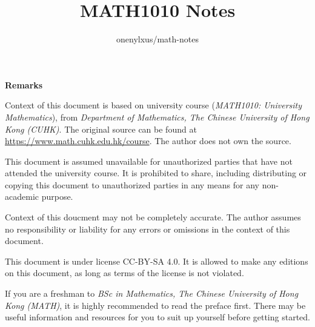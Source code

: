 %
%




\title{MATH1010 Notes}
\author{onenylxus/math-notes}
\makeatletter
\let\getauthor\@author
\let\gettitle\@title
\makeatother
\maketitle
\thispagestyle{empty}

\n\n

\noindent \textbf{Remarks}
\begin{nlist}
  \item Context of this document is based on university course (\textit{MATH1010: University Mathematics}), from \textit{Department of Mathematics, The Chinese University of Hong Kong (CUHK)}. The original source can be found at \url{https://www.math.cuhk.edu.hk/course}. The author does not own the source.
  \item This document is assumed unavailable for unauthorized parties that have not attended the university course. It is prohibited to share, including distributing or copying this document to unauthorized parties in any means for any non-academic purpose.
  \item Context of this doucment may not be completely accurate. The author assumes no responsibility or liability for any errors or omissions in the context of this document.
  \item This document is under license CC-BY-SA 4.0. It is allowed to make any editions on this document, as long as terms of the license is not violated.\color{aw}
  \item If you are a freshman to \textit{BSc in Mathematics, The Chinese University of Hong Kong (MATH)}, it is highly recommended to read the preface first. There may be useful information and resources for you to suit up yourself before getting started.
\end{nlist}

\pagebreak

\tableofcontents
\thispagestyle{empty}
\pagebreak

